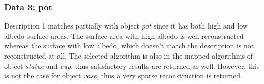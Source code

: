 
\subsubsection{Data 3: pot}
Description 1 matches partially with object \textit{pot} since it has both high and low albedo surface areas. The surface area with high albedo is well reconstructed whereas the surface with low albedo, which doesn't match the description is not reconstructed at all. The selected algorithm is also in the mapped algorithms of object \textit{statue} and \textit{cup}, thus satisfactory results are returned as well. However, this is not the case for object \textit{vase}, thus a very sparse reconstruction is returned.


